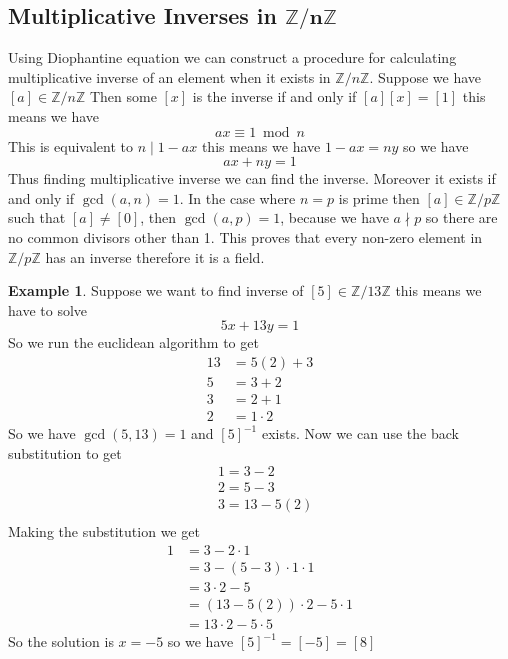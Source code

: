 \documentclass[16pt,a4paper]{article}
\theoremstyle{definition}
\newtheorem{example}{Example}
\begin{document}
\subsection{Multiplicative Inverses in $\mathds{Z}\mathbf{/n}\mathds{Z}$}
Using Diophantine equation we can construct a procedure for calculating multiplicative inverse of an element when it exists in $\mathbb{Z}/n\mathbb{Z}$. Suppose we have $[a]\in \mathbb{Z}/n\mathbb{Z}$ Then some $[x]$ is the inverse if and only if $[a][x] = [1]$ this means we have 
\[ax\equiv 1\bmod n\]
This is equivalent to $n\mid 1-ax$ this means we have $1-ax = ny$ so we have 
\[ax+ny=1\]
Thus finding multiplicative inverse we can find the inverse. Moreover it exists if and only if $\gcd(a,n) = 1$. In the case where $n=p$ is prime then $[a]\in \mathbb{Z}/p\mathbb{Z}$ such that $[a]\neq [0]$, then $\gcd(a,p) = 1$, because we have $a\nmid p$  so there are no common divisors other than 1. This proves that every non-zero element in $\mathbb{Z}/p\mathbb{Z}$ has an inverse therefore it is a field. 
\begin{example}
Suppose we want to find inverse of $[5]\in \mathbb{Z}/13\mathbb{Z}$ this means we have to solve 
\[5x+13y=1\]
So we run the euclidean algorithm to get
\begin{align*}
13 &= 5(2) + 3 \\
5 &= 3+2 \\
3 &= 2+1 \\
2 &= 1\cdot 2
\end{align*} 
So we have $\gcd(5,13) = 1$ and $[5]^{-1}$ exists. Now we can use the back substitution to get
\begin{align*}
&1 = 3-2 \\
&2 = 5-3 \\
&3 = 13-5(2)\\
\end{align*} 
Making the substitution we get
\begin{align*}
1&=3-2\cdot 1\\
&= 3-(5-3)\cdot 1\cdot 1 \\
&=3\cdot 2-5 \\
&= (13-5(2))\cdot 2-5\cdot 1\\
&= 13\cdot 2 - 5\cdot 5
\end{align*} 
So the solution is $x=-5$ so we have $[5]^{-1}=[-5] = [8]$
\end{example}




























 
\end{document}
